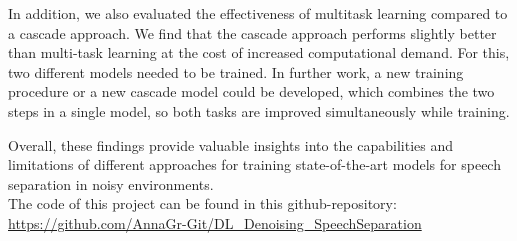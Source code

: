 \documentclass{article}
\begin{document}
In addition, we also evaluated the effectiveness of multitask learning compared to a cascade approach. We find that the cascade approach performs slightly better than multi-task learning at the cost of increased computational demand. For this, two different models needed to be trained. In further work, a new training procedure or a new cascade model could be developed, which combines the two steps in a single model, so both tasks are improved simultaneously while training. 

Overall, these findings provide valuable insights into the capabilities and limitations of different approaches for training state-of-the-art models for speech separation in noisy environments.\\

The code of this project can be found in this github-repository: \url{https://github.com/AnnaGr-Git/DL_Denoising_SpeechSeparation}




\newpage


\end{document}
